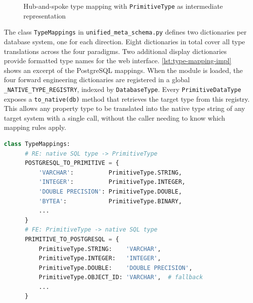 \begin{figure}[htbp]
    \caption{Hub-and-spoke type mapping with \texttt{PrimitiveType} as intermediate representation}
    \label{fig:type-mapping-hub}
  \end{figure}

The class \texttt{TypeMappings} in \texttt{unified\_meta\_schema.py} defines two dictionaries per database system, one for each direction. Eight dictionaries in total
  cover all type translations across the four paradigms. Two additional display dictionaries provide formatted type names for the web interface. \autoref{lst:type-mapping-impl} shows an excerpt of the PostgreSQL mappings. When the
  module is loaded, the four forward engineering dictionaries are registered in a global \texttt{\_NATIVE\_TYPE\_REGISTRY}, indexed by \texttt{DatabaseType}. Every
  \texttt{PrimitiveDataType} exposes a \texttt{to\_native(db)} method that retrieves the target type from this registry. This allows any property type to be translated
  into the native type string of any target system with a single call, without the caller needing to know which mapping rules apply.


  \begin{lstlisting}[language=Python, basicstyle=\small\ttfamily, caption={PostgreSQL type mappings in \texttt{TypeMappings} (excerpt)}, label={lst:type-mapping-impl}]
  class TypeMappings:
      # RE: native SQL type -> PrimitiveType
      POSTGRESQL_TO_PRIMITIVE = {
          'VARCHAR':          PrimitiveType.STRING,
          'INTEGER':          PrimitiveType.INTEGER,
          'DOUBLE PRECISION': PrimitiveType.DOUBLE,
          'BYTEA':            PrimitiveType.BINARY,
          ...
      }
      # FE: PrimitiveType -> native SQL type
      PRIMITIVE_TO_POSTGRESQL = {
          PrimitiveType.STRING:    'VARCHAR',
          PrimitiveType.INTEGER:   'INTEGER',
          PrimitiveType.DOUBLE:    'DOUBLE PRECISION',
          PrimitiveType.OBJECT_ID: 'VARCHAR',  # fallback
          ...
      }
  \end{lstlisting}



